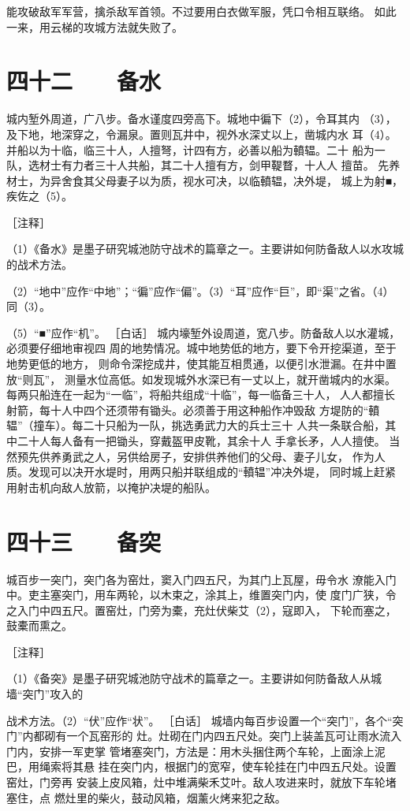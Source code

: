 \documentclass[12pt,UTF8]{ctexbook}
\begin{document}
能攻破敌军军营，擒杀敌军首领。不过要用白衣做军服，凭口令相互联络。 
如此一来，用云梯的攻城方法就失败了。 

\chapter{四十二　　备水}

城内堑外周道，广八步。备水谨度四旁高下。城地中徧下（2），令耳其内 
（3），及下地，地深穿之，令漏泉。置则瓦井中，视外水深丈以上，凿城内水 
耳（4）。 
并船以为十临，临三十人，人擅弩，计四有方，必善以船为轒辒。二十 
船为一队，选材士有力者三十人共船，其二十人擅有方，剑甲鞮瞀，十人人 
擅苗。 
先养材士，为异舍食其父母妻子以为质，视水可决，以临轒辒，决外堤， 
城上为射■，疾佐之（5）。 


［注释］ 

（1）《备水》是墨子研究城池防守战术的篇章之一。主要讲如何防备敌人以水攻城的战术方法。 

（2）“地中”应作“中地”；“徧”应作“偏”。（3）“耳”应作“巨”，即“渠”之省。（4）同（3）。 

（5）“■”应作“机”。 
［白话］ 
城内壕堑外设周道，宽八步。防备敌人以水灌城，必须要仔细地审视四 
周的地势情况。城中地势低的地方，要下令开挖渠道，至于地势更低的地方， 
则命令深挖成井，使其能互相贯通，以便引水泄漏。在井中置放“则瓦”， 
测量水位高低。如发现城外水深已有一丈以上，就开凿城内的水渠。 
每两只船连在一起为“一临”，将船共组成“十临”，每一临备三十人， 
人人都擅长射箭，每十人中四个还须带有锄头。必须善于用这种船作冲毁敌 
方堤防的“轒辒”（撞车）。每二十只船为一队，挑选勇武力大的兵士三十 
人共一条联合船，其中二十人每人备有一把锄头，穿戴盔甲皮靴，其余十人 
手拿长矛，人人擅使。 
当然预先供养勇武之人，另供给房子，安排供养他们的父母、妻子儿女， 
作为人质。发现可以决开水堤时，用两只船并联组成的“轒辒”冲决外堤， 
同时城上赶紧用射击机向敌人放箭，以掩护决堤的船队。 

\chapter{四十三　　备突}

城百步一突门，突门各为窑灶，窦入门四五尺，为其门上瓦屋，毋令水 
潦能入门中。吏主塞突门，用车两轮，以木束之，涂其上，维置突门内，使 
度门广狭，令之入门中四五尺。置窑灶，门旁为橐，充灶伏柴艾（2），寇即入， 
下轮而塞之，鼓橐而熏之。 


［注释］ 

（1）《备突》是墨子研究城池防守战术的篇章之一。主要讲如何防备敌人从城墙“突门”攻入的 

战术方法。（2）“伏”应作“状”。 
［白话］ 
城墙内每百步设置一个“突门”，各个“突门”内都砌有一个瓦窑形的 
灶。灶砌在门内四五尺处。突门上装盖瓦可让雨水流入门内，安排一军吏掌 
管堵塞突门，方法是：用木头捆住两个车轮，上面涂上泥巴，用绳索将其悬 
挂在突门内，根据门的宽窄，使车轮挂在门中四五尺处。设置窑灶，门旁再 
安装上皮风箱，灶中堆满柴禾艾叶。敌人攻进来时，就放下车轮堵塞住，点 
燃灶里的柴火，鼓动风箱，烟薰火烤来犯之敌。 
\end{document}

